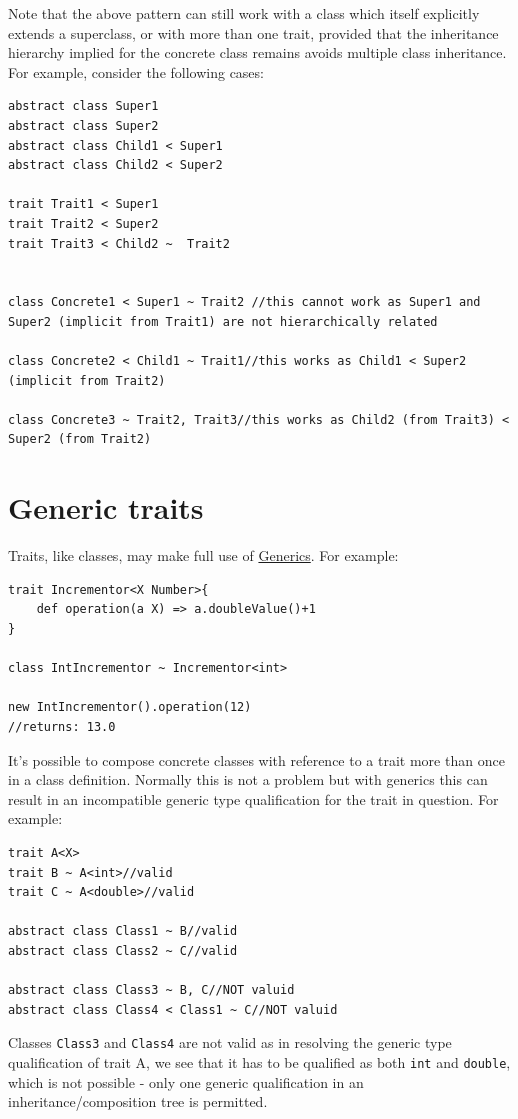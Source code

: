 \documentclass[conc-doc]{subfiles}
\begin{document}
Note that the above pattern can still work with a class which itself explicitly extends a superclass, or with more than one trait, provided that the inheritance hierarchy implied for the concrete class remains avoids multiple class inheritance. For example, consider the following cases:
\begin{lstlisting}
abstract class Super1
abstract class Super2
abstract class Child1 < Super1
abstract class Child2 < Super2

trait Trait1 < Super1
trait Trait2 < Super2
trait Trait3 < Child2 ~  Trait2


class Concrete1 < Super1 ~ Trait2 //this cannot work as Super1 and Super2 (implicit from Trait1) are not hierarchically related 

class Concrete2 < Child1 ~ Trait1//this works as Child1 < Super2 (implicit from Trait2)

class Concrete3 ~ Trait2, Trait3//this works as Child2 (from Trait3) < Super2 (from Trait2) 
\end{lstlisting}

\section{Generic traits}
Traits, like classes, may make full use of \hyperref[ch:generics]{Generics}. For example:
\begin{lstlisting}
trait Incrementor<X Number>{
	def operation(a X) => a.doubleValue()+1
}

class IntIncrementor ~ Incrementor<int>

new IntIncrementor().operation(12)
//returns: 13.0
\end{lstlisting}

It's possible to compose concrete classes with reference to a trait more than once in a class definition. Normally this is not a problem but with generics this can result in an incompatible generic type qualification for the trait in question. For example:
\begin{lstlisting}
trait A<X>
trait B ~ A<int>//valid
trait C ~ A<double>//valid

abstract class Class1 ~ B//valid
abstract class Class2 ~ C//valid

abstract class Class3 ~ B, C//NOT valuid
abstract class Class4 < Class1 ~ C//NOT valuid
\end{lstlisting}

Classes \lstinline{Class3} and \lstinline{Class4} are not valid as in resolving the generic type qualification of trait A, we see that it has to be qualified as both \lstinline{int} and \lstinline{double}, which is not possible - only one generic qualification in an inheritance/composition tree is permitted.
\end{document}
